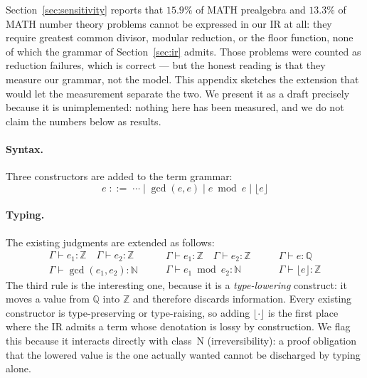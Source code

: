 \documentclass[11pt,a4paper]{article}
\begin{document}
Section~\ref{sec:sensitivity} reports that $15.9\%$ of MATH prealgebra and
$13.3\%$ of MATH number theory problems cannot be expressed in our IR at all:
they require greatest common divisor, modular reduction, or the floor function,
none of which the grammar of Section~\ref{sec:ir} admits.  Those problems were
counted as reduction failures, which is correct --- but the honest reading is
that they measure our grammar, not the model.  This appendix sketches the
extension that would let the measurement separate the two.  We present it as a
draft precisely because it is unimplemented: nothing here has been measured,
and we do not claim the numbers below as results.

\paragraph{Syntax.}
Three constructors are added to the term grammar:
\[
e \;::=\; \cdots \mid \gcd(e,e) \mid e \bmod e \mid \lfloor e \rfloor
\]

\paragraph{Typing.}
The existing judgments are extended as follows:
\[
\begin{array}{c}
\Gamma \vdash e_1 : \mathbb{Z} \quad \Gamma \vdash e_2 : \mathbb{Z} \\ \hline
\Gamma \vdash \gcd(e_1,e_2) : \mathbb{N}
\end{array}
\qquad
\begin{array}{c}
\Gamma \vdash e_1 : \mathbb{Z} \quad \Gamma \vdash e_2 : \mathbb{Z} \\ \hline
\Gamma \vdash e_1 \bmod e_2 : \mathbb{N}
\end{array}
\qquad
\begin{array}{c}
\Gamma \vdash e : \mathbb{Q} \\ \hline
\Gamma \vdash \lfloor e \rfloor : \mathbb{Z}
\end{array}
\]
The third rule is the interesting one, because it is a \emph{type-lowering}
construct: it moves a value from $\mathbb{Q}$ into $\mathbb{Z}$ and therefore
discards information.  Every existing constructor is type-preserving or
type-raising, so adding $\lfloor \cdot \rfloor$ is the first place where the IR
admits a term whose denotation is lossy by construction.  We flag this because
it interacts directly with class~N (irreversibility): a proof obligation that
the lowered value is the one actually wanted cannot be discharged by typing
alone.
\end{document}
